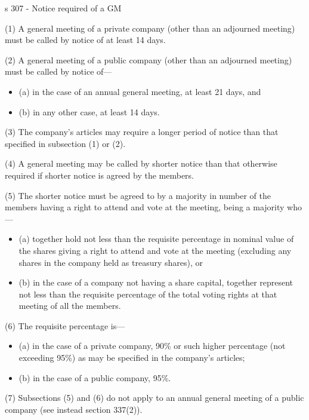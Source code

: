 \documentclass[
]{article}
\providecommand{\tightlist}{%
  \setlength{\itemsep}{0pt}\setlength{\parskip}{0pt}}
\newenvironment{env-12fb5320-b8eb-47b6-8035-097e16242c42}
{
    \savenotes\tcolorbox[blanker,breakable,left=5pt,borderline west={2pt}{-4pt}{green}]
}
{
    \endtcolorbox\spewnotes
}
\begin{document}
\begin{env-12fb5320-b8eb-47b6-8035-097e16242c42}

s 307 - Notice required of a GM

(1) A general meeting of a private company (other than an adjourned
meeting) must be called by notice of at least 14 days.

(2) A general meeting of a public company (other than an adjourned
meeting) must be called by notice of---

\begin{itemize}
\tightlist
\item
  (a) in the case of an annual general meeting, at least 21 days, and
\item
  (b) in any other case, at least 14 days.
\end{itemize}

(3) The company's articles may require a longer period of notice than
that specified in subsection (1) or (2).

(4) A general meeting may be called by shorter notice than that
otherwise required if shorter notice is agreed by the members.

(5) The shorter notice must be agreed to by a majority in number of the
members having a right to attend and vote at the meeting, being a
majority who---

\begin{itemize}
\tightlist
\item
  (a) together hold not less than the requisite percentage in nominal
  value of the shares giving a right to attend and vote at the meeting
  (excluding any shares in the company held as treasury shares), or
\item
  (b) in the case of a company not having a share capital, together
  represent not less than the requisite percentage of the total voting
  rights at that meeting of all the members.
\end{itemize}

(6) The requisite percentage is---

\begin{itemize}
\tightlist
\item
  (a) in the case of a private company, 90\% or such higher percentage
  (not exceeding 95\%) as may be specified in the company's articles;
\item
  (b) in the case of a public company, 95\%.
\end{itemize}

(7) Subsections (5) and (6) do not apply to an annual general meeting of
a public company (see instead section 337(2)).

\end{env-12fb5320-b8eb-47b6-8035-097e16242c42}
\end{document}
